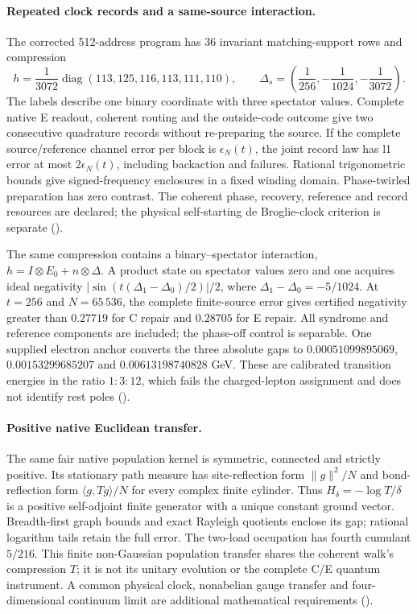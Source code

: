 \paragraph{Repeated clock records and a same-source interaction.}
The corrected 512-address program has 36 invariant matching-support
rows and compression
\[
 h=\frac1{3072}\operatorname{diag}(113,125,116,113,111,110),\qquad
 \Delta_s=\left(\frac1{256},-\frac1{1024},-\frac1{3072}\right).
\]
The labels describe one binary coordinate with three spectator values.
Complete native E readout, coherent routing and the outside-code outcome
give two consecutive quadrature records without re-preparing the source.
If the complete source/reference channel error per block is
$\epsilon_N(t)$, the joint record law has l1 error at most
$2\epsilon_N(t)$, including backaction and failures.  Rational
trigonometric bounds give signed-frequency enclosures in a fixed winding
domain.  Phase-twirled preparation has zero contrast.  The coherent
phase, recovery, reference and record resources are declared; the
physical self-starting de Broglie-clock criterion is separate
().

The same compression contains a binary--spectator interaction,
$h=I\otimes E_0+n\otimes\Delta$.  A product state on spectator values zero
and one acquires ideal negativity
$|\sin(t(\Delta_1-\Delta_0)/2)|/2$, where
$\Delta_1-\Delta_0=-5/1024$.  At $t=256$ and $N=65\,536$, the complete
finite-source error gives certified negativity greater than $0.27719$
for C repair and $0.28705$ for E repair.  All syndrome and reference
components are included; the phase-off control is separable.
One supplied electron anchor converts the three absolute gaps to
$0.00051099895069$, $0.00153299685207$ and $0.00613198740828$ GeV.
These are calibrated transition energies in the ratio $1:3:12$,
which fails the charged-lepton assignment and does not identify rest
poles ().

\paragraph{Positive native Euclidean transfer.}
The same fair native population kernel is symmetric, connected and
strictly positive.  Its stationary path measure has site-reflection form
$\|g\|^2/N$ and bond-reflection form $\langle g,Tg\rangle/N$ for every
complex finite cylinder.  Thus $H_\delta=-\log T/\delta$ is a positive
self-adjoint finite generator with a unique constant ground vector.
Breadth-first graph bounds and exact Rayleigh quotients enclose its gap;
rational logarithm tails retain the full error.  The two-load occupation
has fourth cumulant $5/216$.  This finite non-Gaussian population transfer
shares the coherent walk's compression $T$; it is not its unitary
evolution or the complete C/E quantum instrument.  A common physical
clock, nonabelian gauge transfer and four-dimensional continuum limit
are additional mathematical requirements
().
